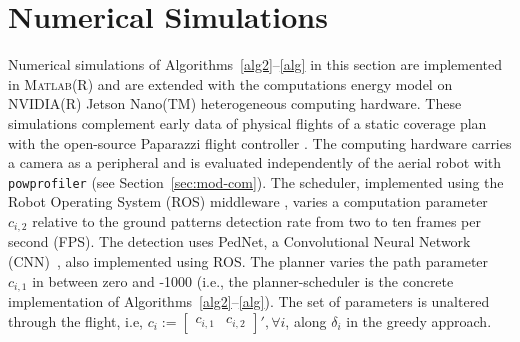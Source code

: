 \documentclass[letterpaper,10pt,journal,twoside]{IEEEtran}
\newcommand{\stt}[1]{{\small\tt #1}} %
\newcommand{\powprof}{\stt{powprofiler}}
\newcommand{\figpath}{./figures}
\theoremstyle{definition}
\begin{document}
\begin{figure*}
  \centering
  \footnotesize
  
  \vspace*{-.6ex}
  \caption{\color{blue}
  Planning-scheduling of CPP and ground patterns detections%
  , utilizing the lowest configuration \hyperref[fig:trajs-I-static]{I} as a starting point in \hyperref[fig:trajs-dyn-i]{i} and the highest \hyperref[fig:trajs-II-static]{II} in \hyperref[fig:trajs-dyn-ii]{ii} while varying atmospheric (same as Fig.~\ref{fig:stat}) and battery conditions. In \hyperref[fig:dyn]{a} are the re-planned trajectories, in \hyperref[fig:dyn]{b} the parameters, and in \hyperref[fig:dyn]{c} the energy w.r.t. the battery.
  }
  \label{fig:dyn}
  \vspace*{-4ex}
\end{figure*}


\vspace*{-1.4ex}
\section{Numerical Simulations} %
\label{sec:experimental}        %
\vspace*{-.2ex}

Numerical simulations of Algorithms~\ref{alg2}--\ref{alg} in this section are implemented in \textsc{Matlab}\hspace{.5ex}(R) and are extended with the computations energy model on NVIDIA\hspace{.5ex}(R) Jetson Nano\hspace{.5ex}(TM) heterogeneous computing hardware. These simulations complement early data of physical flights of a static coverage plan with the open-source Paparazzi flight controller%
.
The computing hardware carries a camera as a peripheral and is evaluated independently of the aerial robot with \powprof{} (see Section~\ref{sec:mod-com}). The scheduler, implemented using the Robot Operating System (ROS) middleware%
, varies a computation parameter $c_{i,2}$ relative to the ground patterns detection rate from two to ten frames per second (FPS). The detection uses PedNet, a Convolutional Neural Network (CNN)~\cite{ullah2018pednet}, also implemented using ROS. The planner varies the path parameter $c_{i,1}$ in %
between zero and -1000 (i.e., the planner-scheduler is the concrete implementation of Algorithms~\ref{alg2}--\ref{alg}). The set of parameters is unaltered through the flight, i.e, $c_i:=\begin{bmatrix}c_{i,1}&c_{i,2}\end{bmatrix}',\forall i${\color{blue}, along $\delta_i$ %
in the greedy approach}. 
\end{document}

